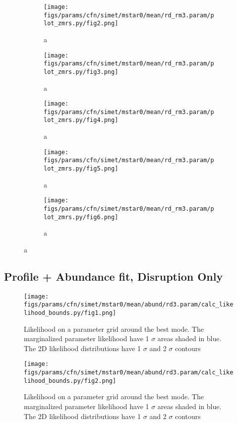 \documentclass[twocolumn]{article}
\begin{document}
\begin{figure}
  \begin{subfigure}{.5\textwidth}
    \centering\texttt{[image: figs/params/cfn/simet/mstar0/mean/rd\_rm3.param/plot\_zmrs.py/fig2.png]}
    \caption{a}
  \end{subfigure}
  \begin{subfigure}{.5\textwidth}
    \centering\texttt{[image: figs/params/cfn/simet/mstar0/mean/rd\_rm3.param/plot\_zmrs.py/fig3.png]}
    \caption{a}
  \end{subfigure}
  \begin{subfigure}{.5\textwidth}
    \centering\texttt{[image: figs/params/cfn/simet/mstar0/mean/rd\_rm3.param/plot\_zmrs.py/fig4.png]}
    \caption{a}
  \end{subfigure}%
  \begin{subfigure}{.5\textwidth}
    \centering\texttt{[image: figs/params/cfn/simet/mstar0/mean/rd\_rm3.param/plot\_zmrs.py/fig5.png]}
    \caption{a}
  \end{subfigure}
  \begin{subfigure}{.5\textwidth}
    \centering\texttt{[image: figs/params/cfn/simet/mstar0/mean/rd\_rm3.param/plot\_zmrs.py/fig6.png]}
    \caption{a}
  \end{subfigure}
  
\end{figure}
\clearpage




\subsection{Profile + Abundance fit, Disruption Only}
\begin{figure}[H]
  \center\texttt{[image: figs/params/cfn/simet/mstar0/mean/abund/rd3.param/calc\_likelihood\_bounds.py/fig1.png]}
  \caption{Likelihood on a parameter grid around the best mode. The marginalized parameter likelihood have
    1 $\sigma$ areas shaded in blue. The 2D likelihood distributions have 1 $\sigma$  and 2 $\sigma$ contours}
  \label{fig:basic_rd:likelihood}
\end{figure}

\begin{figure}[H]
  \center\texttt{[image: figs/params/cfn/simet/mstar0/mean/abund/rd3.param/calc\_likelihood\_bounds.py/fig2.png]}
  \caption{Likelihood on a parameter grid around the best mode. The marginalized parameter likelihood have
    1 $\sigma$ areas shaded in blue. The 2D likelihood distributions have 1 $\sigma$  and 2 $\sigma$ contours}
  \label{fig:basic_rd:likelihood}
\end{figure}
\end{document}
